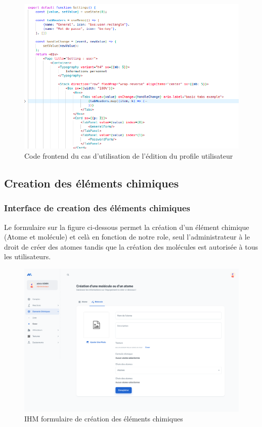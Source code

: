 \begin{figure}[H]
	\centering
	\includegraphics[width=1\textwidth]{img/fuu}
	\caption{Code frontend du cas d'utilisation de l'édition du profile utilisateur}
	\label{fig:mesh1}
\end{figure}

\subsection{Creation des éléments chimiques}

\subsubsection{Interface de creation des éléments chimiques}

Le formulaire sur la figure ci-dessous permet la création d'un élément chimique (Atome et molécule) et celà en fonction de notre role, seul l'administrateur à le droit de créer des atomes tandis que la création des molécules est autorisée à tous les utilisateurs.

\begin{figure}[H]
	\centering
	\includegraphics[width=1\textwidth]{img/iec}
	\caption{IHM formulaire de création des éléments chimiques}
	\label{fig:mesh1}
\end{figure}


